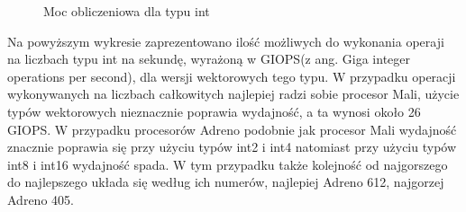 \begin{figure}[H]
\caption{Moc obliczeniowa dla typu int}
\end{figure}
Na powyższym wykresie zaprezentowano ilość możliwych do wykonania operaji na liczbach typu int na sekundę, wyrażoną w GIOPS(z ang. Giga integer operations per second), dla wersji wektorowych tego typu. W przypadku operacji wykonywanych na liczbach całkowitych najlepiej radzi sobie procesor Mali, użycie typów wektorowych nieznacznie poprawia wydajność, a ta wynosi około 26 GIOPS. W przypadku procesorów Adreno podobnie jak procesor Mali wydajność znacznie poprawia się przy użyciu typów int2 i int4 natomiast przy użyciu typów int8 i int16 wydajność spada. W tym przypadku także kolejność od najgorszego do najlepszego układa się według ich numerów, najlepiej Adreno 612, najgorzej Adreno 405.



